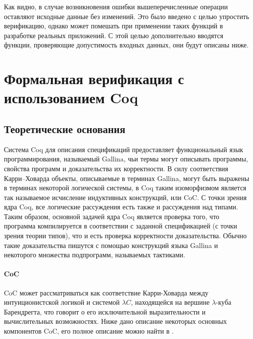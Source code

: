 Как видно, в случае возникновения ошибки вышеперечисленные операции оставляют исходные данные без изменений. Это было введено с целью упростить верификацию, однако может помешать при применении таких функций в разработке реальных приложений. С этой целью дополнительно вводятся функции, проверяющие допустимость входных данных, они будут описаны ниже.

\section{Формальная верификация с использованием Coq}

\subsection{Теоретические основания}

Система Coq для описания спецификаций предоставляет функциональный язык программирования, называемый Gallina, чьи термы могут описывать программы, свойства программ и доказательства их корректности. В силу соответствия Карри--Ховарда объекты, описываемые в терминах Gallina, могут быть выражены в терминах некоторой логической системы, в Coq таким изоморфизмом является так называемое исчисление индуктивных конструкций, или CoC. С точки зрения ядра Coq, все логические рассуждения есть также и рассуждения над типами. Таким образом, основной задачей ядра Coq является проверка того, что программа компилируется в соответствии с заданной спецификацией (с точки зрения теории типов), что и есть проверка корректности доказательства. Обычно такие доказательства пишутся с помощью конструкций языка Gallina и некоторого множества подпрограмм, называемых тактиками.

\paragraph{CoC} CoC может рассматриваться как соответствие Карри-Ховарда между интуиционистской логикой и системой $\lambda C$, находящейся на вершине $\lambda$-куба Барендрегта, что говорит о его исключительной выразительности и вычислительных возможностях. Ниже дано описание некоторых основных компонентов CoC, его полное описание можно найти в \autocite{CoqManual}.

